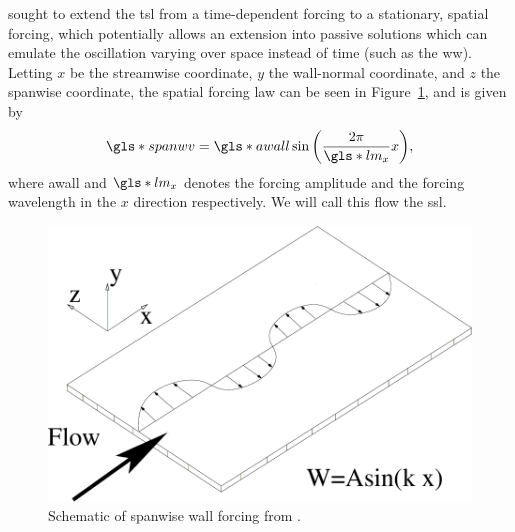 \textcite{viotti2009} sought to extend the \gls*{tsl} from a time-dependent forcing to a stationary, spatial forcing, which potentially allows an extension into passive solutions which can emulate the oscillation varying over space instead of time (such as the \gls*{ww}). Letting $x$ be the streamwise coordinate, $y$ the wall-normal coordinate, and $z$ the spanwise coordinate, the spatial forcing law can be seen in Figure~\ref{fig:ssl}, and is given by
\begin{equation}
	\gls*{spanwv} = \gls*{awall}\sin{\left( \frac{2\pi}{\gls*{lm}_x} x \right)} 
,\end{equation}
where \gls*{awall} and $\gls*{lm}_x$ denotes the forcing amplitude and the forcing wavelength in the $x$ direction respectively. We will call this flow the \gls*{ssl}.

\begin{figure}[htbp]
	\centering
	\includegraphics[width=0.5\linewidth]{introduction/fig/ssl.png}
	\caption[Schematic of spanwise wall forcing]{Schematic of spanwise wall forcing from \cite{viotti2009}.}
	\label{fig:ssl}
\end{figure}

